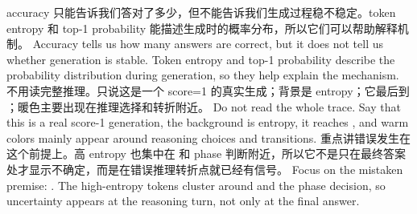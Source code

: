 {}\markdownRendererInterblockSeparator
{}\markdownRendererInterblockSeparator
{}accuracy 只能告诉我们答对了多少，但不能告诉我们生成过程稳不稳定。token entropy 和 top-1 probability 能描述生成时的概率分布，所以它们可以帮助解释机制。\markdownRendererInterblockSeparator
{}\markdownRendererInterblockSeparator
{}Accuracy tells us how many answers are correct, but it does not tell us whether generation is stable. Token entropy and top-1 probability describe the probability distribution during generation, so they help explain the mechanism.\markdownRendererInterblockSeparator
{}\markdownRendererInterblockSeparator
{}\markdownRendererInterblockSeparator
{}不用读完整推理。只说这是一个 score=1 的真实生成；背景是 entropy；它最后到 ；暖色主要出现在推理选择和转折附近。\markdownRendererInterblockSeparator
{}\markdownRendererInterblockSeparator
{}Do not read the whole trace. Say that this is a real score-1 generation, the background is entropy, it reaches , and warm colors mainly appear around reasoning choices and transitions.\markdownRendererInterblockSeparator
{}\markdownRendererInterblockSeparator
{}\markdownRendererInterblockSeparator
{}重点讲错误发生在  这个前提上。高 entropy 也集中在  和 phase 判断附近，所以它不是只在最终答案处才显示不确定，而是在错误推理转折点就已经有信号。\markdownRendererInterblockSeparator
{}\markdownRendererInterblockSeparator
{}Focus on the mistaken premise: . The high-entropy tokens cluster around  and the phase decision, so uncertainty appears at the reasoning turn, not only at the final answer.\markdownRendererDocumentEnd